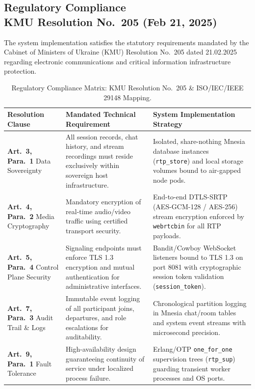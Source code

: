\documentclass{article}
\begin{document}
\subsection{Regulatory Compliance \\ KMU Resolution No.~205 (Feb 21, 2025)}

The system implementation satisfies the statutory requirements mandated by the Cabinet of Ministers of Ukraine (KMU) Resolution No.~205 dated 21.02.2025 regarding electronic communications and critical information infrastructure protection.

\begin{table}[htbp!]
\centering
\caption{Regulatory Compliance Matrix: KMU Resolution No.~205 \& ISO/IEC/IEEE 29148 Mapping.}
\label{tab:kmu_205_compliance}
\small
\begin{tabular}{@{}p{2.8cm}p{5.5cm}p{6.2cm}@{}}
\toprule
\textbf{Resolution Clause} & \textbf{Mandated Technical Requirement} & \textbf{System Implementation Strategy} \\
\midrule
\textbf{Art.~3, Para.~1} \newline Data Sovereignty & 
All session records, chat history, and stream recordings must reside exclusively within sovereign host infrastructure. & 
Isolated, share-nothing Mnesia database instances (\texttt{rtp\_store}) and local storage volumes bound to air-gapped node pods. \\
\midrule
\textbf{Art.~4, Para.~2} \newline Media Cryptography & 
Mandatory encryption of real-time audio/video traffic using certified transport security. & 
End-to-end DTLS-SRTP (AES-GCM-128 / AES-256) stream encryption enforced by \texttt{webrtcbin} for all RTP payloads. \\
\midrule
\textbf{Art.~5, Para.~4} \newline Control Plane Security & 
Signaling endpoints must enforce TLS 1.3 encryption and mutual authentication for administrative interfaces. & 
Bandit/Cowboy WebSocket listeners bound to TLS 1.3 on port 8081 with cryptographic session token validation (\texttt{session\_token}). \\
\midrule
\textbf{Art.~7, Para.~3} \newline Audit Trail \& Logs & 
Immutable event logging of all participant joins, departures, and role escalations for auditability. & 
Chronological partition logging in Mnesia chat/room tables and system event streams with microsecond precision. \\
\midrule
\textbf{Art.~9, Para.~1} \newline Fault Tolerance & 
High-availability design guaranteeing continuity of service under localized process failure. & 
Erlang/OTP \texttt{one\_for\_one} supervision trees (\texttt{rtp\_sup}) guarding transient worker processes and OS ports. \\
\bottomrule
\end{tabular}
\end{table}
\end{document}

